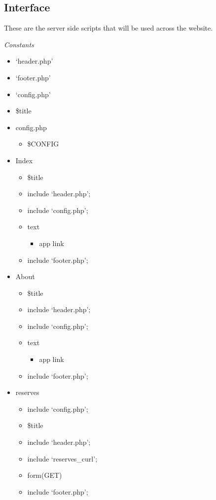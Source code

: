 \subsection{Interface}
    These are the server side scripts that will be used across the website.

    \emph{Constants}
    \begin{itemize}
        \item `header.php'
        \item `footer.php'
        \item `config.php'
        \item \$title   
        \item config.php
        \begin{itemize}
            \item \$CONFIG
        \end{itemize}

        \item Index
        \begin{itemize}
            \item \$title
            \item include `header.php';
            \item include `config.php';
            \item text
            \begin{itemize}
                \item app link
            \end{itemize}
            \item include `footer.php';
        \end{itemize}

        \item About
        \begin{itemize}
            \item \$title
            \item include `header.php';
            \item include `config.php';
            \item text
            \begin{itemize}
                \item app link
            \end{itemize}
            \item include `footer.php';
        \end{itemize}       

        \item reserves
        \begin{itemize}
            \item include `config.php';
            \item \$title
            \item include `header.php';
            \item include `reserves\_curl';
            \item form(GET)
            \item include `footer.php';
        \end{itemize}
        

\end{itemize}
